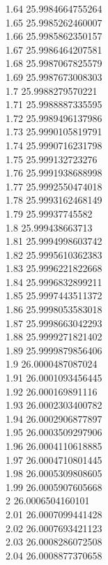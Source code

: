{1.64	25.9984664755264\\
1.65	25.9985262460007\\
1.66	25.9985862350157\\
1.67	25.9986464207581\\
1.68	25.9987067825579\\
1.69	25.9987673008303\\
1.7	25.9988279570221\\
1.71	25.9988887335595\\
1.72	25.9989496137986\\
1.73	25.9990105819791\\
1.74	25.9990716231798\\
1.75	25.999132723276\\
1.76	25.9991938688998\\
1.77	25.9992550474018\\
1.78	25.9993162468149\\
1.79	25.99937745582\\
1.8	25.999438663713\\
1.81	25.9994998603742\\
1.82	25.9995610362383\\
1.83	25.9996221822668\\
1.84	25.9996832899211\\
1.85	25.9997443511372\\
1.86	25.9998053583018\\
1.87	25.9998663042293\\
1.88	25.9999271821402\\
1.89	25.9999879856406\\
1.9	26.0000487087024\\
1.91	26.0001093456445\\
1.92	26.000169891116\\
1.93	26.0002303400782\\
1.94	26.0002906877897\\
1.95	26.0003509297906\\
1.96	26.0004110618885\\
1.97	26.0004710801445\\
1.98	26.0005309808605\\
1.99	26.0005907605668\\
2	26.0006504160101\\
2.01	26.0007099441428\\
2.02	26.0007693421123\\
2.03	26.0008286072508\\
2.04	26.0008877370658\\
}
